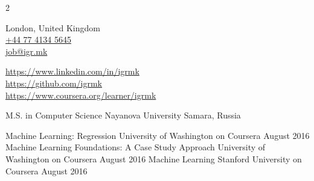 \documentclass[9pt,a4paper]{igrmkcv}
\begin{document}
\begin{paracol}{2}
\newpage
\switchcolumn

    London, United Kingdom\\
    \href{tel:+447741345645}{+44 77 4134 5645}\\
    \href{mailto:job@igr.mk}{job@igr.mk}

    \vspace{6pt}
    {
        \small
        \href{https://www.linkedin.com/in/igrmk}{https://www.linkedin.com/in/igrmk}\\
        \href{https://github.com/igrmk}{https://github.com/igrmk}\\
        \href{https://www.coursera.org/learner/igrmk}{https://www.coursera.org/learner/igrmk}
        \par
    }


    \vspace{6pt}
    {
        \raggedright
    }

    \cvRightEventNoContent
        {M.S. in Computer Science}
        {Nayanova University}
        {}
        {Samara, Russia}

    \cvRightEventNoContent
        {Machine Learning: Regression}
        {University of Washington on Coursera}
        {August 2016}
        {}
    \cvRightEventNoContent
        {Machine Learning Foundations: A Case Study Approach}
        {University of Washington on Coursera}
        {August 2016}
        {}
    \cvRightEventNoContent
        {Machine Learning}
        {Stanford University on Coursera}
        {August 2016}
        {}

\end{paracol}
\end{document}
